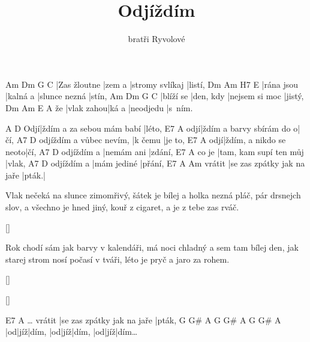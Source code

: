 \documentclass{song}
\title{Odjíždím}
\author{bratři Ryvolové}
\begin{document}
\strophe
Am           Dm     G               C
|Zas žloutne |zem a |stromy svlíkaj |listí,
Dm         Am       H7            E
|rána jsou |kalná a |slunce nezná |stín,
Am        Dm        G              C
|blíží se |den, kdy |nejsem si moc |jistý,
   Dm         Am    E         A
že |vlak zahou|ká a |neodjedu |s~ním.
\endstrophe

    A                         D
Odjí|ždím a za sebou mám babí |léto,
    E7                       A
odjí|ždím a barvy sbírám do o|čí,
                        A7      D
odjíždím a vůbec nevím, |k čemu |je to,
    E7                     A
odjí|ždím, a nikdo se neoto|čí,
           A7         D
odjíždím a |nemám ani |zdání,
      E7                     A
co je |tam, kam supí ten můj |vlak,
           A7          D
odjíždím a |mám jediné |přání,
       E7                         A     Am
vrátit |se zas zpátky jak na jaře |pták.|
\endstrophe

\strophe*
Vlak nečeká na slunce zimomřivý,
šátek je bílej a holka nezná pláč,
pár drsnejch slov, a všechno je hned jiný,
kouř z cigaret, a je z tebe zas rváč.
\endstrophe

\ref{}

\strophe*
Rok chodí sám jak barvy v kalendáři,
má noci chladný a sem tam bílej den,
jak starej strom nosí počasí v tváři,
léto je pryč a jaro za rohem.
\endstrophe

\ref{}

\ref{}

\strophe
                E7                        A
\ldots{} vrátit |se zas zpátky jak na jaře |pták,
G  G#  A     G  G#  A     G  G#  A
|od|jíž|dím, |od|jíž|dím, |od|jíž|dím\ldots
\endstrophe
\end{document}
